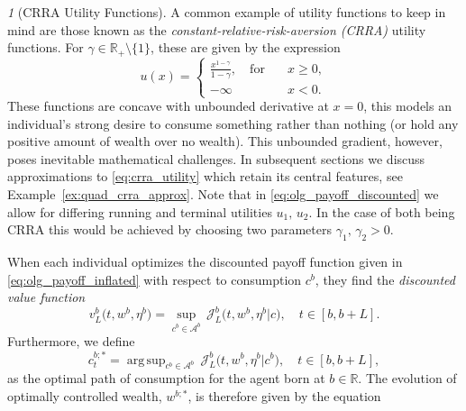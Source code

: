 \documentclass[11pt,oneside,english,reqno,dvipsnames,table]{amsart}
\numberwithin{equation}{section}
\theoremstyle{plain}
\theoremstyle{definition}
\theoremstyle{remark}
\newtheorem{rem}[thm]{\protect\remarkname}
\theoremstyle{plain}
\theoremstyle{plain}
\theoremstyle{plain}
\theoremstyle{plain}
\theoremstyle{plain}
\theoremstyle{plain}
\theoremstyle{plain}
\providecommand{\remarkname}{Remark}
\providecommand{\remarkname}{Remark}
\newcommand{\cA}{\mathcal{A}}
\newcommand{\RR}{\mathbb{R}}
\newcommand{\mcJ}{\mathcal{J}}
\newcommand{\mbR}{\mathbb{R}}
\DeclareMathOperator*{\argsup}{arg\,sup}
\numberwithin{thm}{section}
\begin{document}
\begin{rem}[CRRA Utility Functions]
    A common example of utility functions to keep in mind are those known as the \emph{constant-relative-risk-aversion (CRRA)}  utility functions. For $\gamma \in \RR_+ \setminus \{1\}$, these are given by the expression
%
\begin{equation}\label{eq:crra_utility}
    u(x)= \begin{cases}
             \frac{ x^{1-\gamma}}{1-\gamma}, \quad \mathrm{for} \quad &x \geq 0,
             \\
             -\infty \quad &x<0.
    \end{cases}
\end{equation} 
%
These functions are concave with unbounded derivative at $x=0$, this models an individual's strong desire to consume something rather than nothing (or hold any positive amount of wealth over no wealth). This unbounded gradient, however, poses inevitable mathematical challenges. In subsequent sections we discuss approximations to \eqref{eq:crra_utility} which retain its central features, see Example~\ref{ex:quad_crra_approx}. Note that in \eqref{eq:olg_payoff_discounted} we allow for differing running and terminal utilities $u_1,\,u_2$. In the case of both being CRRA this would be achieved by choosing two parameters $\gamma_1,\,\gamma_2 >0$.
\end{rem}

When each individual optimizes the discounted payoff function given in \eqref{eq:olg_payoff_inflated} with respect to consumption $c^b$, they find the \emph{discounted value function}
%
\begin{equation}\label{eq:value_function_1}
    v^b_L\big(t,w^b,\eta^b\big)=\sup_{c^b\in \cA^b} \, \mcJ^b_L\big(t,w^b,\eta^b|c\big),\quad t\in [b,b+L].  
\end{equation}
%
Furthermore, we define
\begin{equation}\label{eq:optimal consumption}
    c^{b;*}_t = \argsup_{c^b\in \cA^b} \, \mcJ^b_L\big(t,w^b,\eta^b|c^b\big),\quad t\in [b,b+L],
\end{equation}
%
as the optimal path of consumption for the agent born at $b\in \mbR$. The evolution of optimally controlled wealth, $w^{b;*}$, is therefore given by the equation
\end{document}
